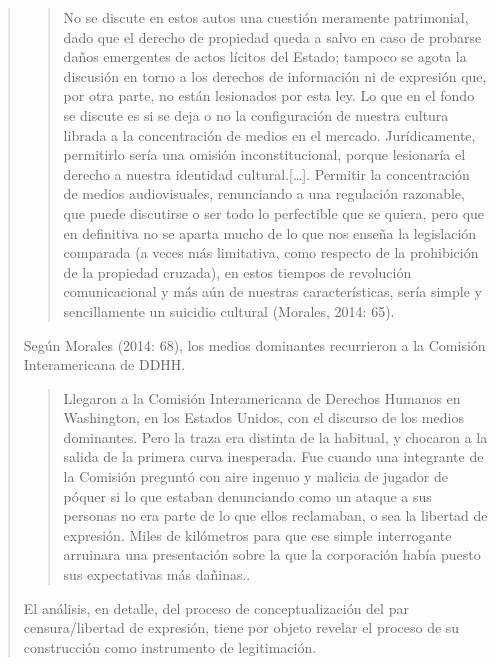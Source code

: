 \begin{quote}
\begin{quote}
	No se discute en estos autos una cuestión meramente patrimonial, dado que el derecho de propiedad queda a salvo en caso de probarse daños emergentes de actos lícitos del Estado; tampoco se agota la discusión en torno a los derechos de información ni de expresión que, por otra parte, no están lesionados por esta ley. Lo que en el fondo se discute  es si se deja o no la configuración de nuestra cultura librada a la concentración de medios en el mercado. Jurídicamente, permitirlo sería una omisión inconstitucional, porque lesionaría el derecho a nuestra identidad cultural.{[}\dots{]}. Permitir la concentración de medios audiovisuales, renunciando a una regulación razonable, que puede discutirse o ser todo lo perfectible que se quiera, pero que en definitiva no se aparta mucho de lo que nos enseña la legislación comparada (a veces más limitativa, como respecto de la prohibición de la propiedad cruzada), en estos tiempos de revolución comunicacional y más aún de nuestras características, sería simple y sencillamente un suicidio cultural (Morales, 2014: 65).
\end{quote}


Según Morales (2014: 68), los medios dominantes recurrieron a la Comisión Interamericana de DDHH.

\begin{quote}
	Llegaron a la Comisión Interamericana de Derechos Humanos en Washington, en los Estados Unidos, con el discurso de los medios dominantes. Pero la traza era distinta de la habitual, y chocaron a la salida de la primera curva inesperada. Fue cuando una integrante de la Comisión preguntó con aire ingenuo y malicia de jugador de póquer si lo que estaban denunciando como un ataque a sus personas no era parte de lo que ellos reclamaban, o sea la libertad de expresión. Miles de kilómetros para que ese simple interrogante arruinara una presentación sobre la que la corporación había puesto sus expectativas más dañinas..
\end{quote}


El análisis, en detalle, del proceso de conceptualización del par censura/libertad de expresión, tiene por objeto revelar el proceso de su construcción como instrumento de legitimación.


\end{quote}
